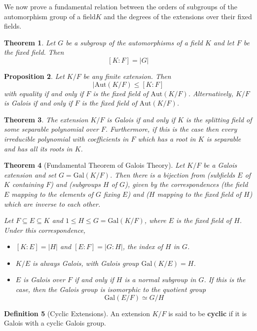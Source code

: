 \documentclass[10pt, oneside, reqno]{amsart}
\theoremstyle{plain}%
\newtheorem{thm}{Theorem}[section]
\newtheorem{prop}[thm]{Proposition}
\theoremstyle{definition}
\newtheorem{defn}[thm]{Definition}
\theoremstyle{remark}
\newcommand{\aut}[1]{\text{Aut}{(#1)}}
\newcommand{\xdeg}[2]{[#1 : #2]}
\newcommand{\gal}[2]{\text{Gal}(#1/#2)}
\begin{document}
We now prove a fundamental relation between the orders of subgroups of the automorphism group of a field$K$ and the degrees of the extensions over their fixed fields.
\begin{thm}
	Let $G$ be a subgroup of the automorphisms of a field $K$ and let $F$ be the fixed field.  Then \[
		\xdeg{K}{F} = |G|
	\]
	
\end{thm}
\begin{prop}
	Let $K/F$ be any finite extension.  Then \[
		| \aut{K/F} \leq \xdeg{K}{F}
	\] with equality if and only if $F$ is the fixed field of $\aut{K/F}$.  Alternatively, $K/F$ is Galois if and only if $F$ is the fixed field of $\aut{K/F}$.
\end{prop}

\begin{thm}
	The extension $K/F$ is Galois if and only if $K$ is the splitting field of some separable polynomial over $F$. Furthermore, if this is the case then every irreducible polynomial with coefficients in $F$ which has a root in $K$ is separable and has all its roots in $K$.
\end{thm}

\begin{thm}[Fundamental Theorem of Galois Theory] Let $K/F$ be a Galois extension and set $G = \gal{K}{F}$.  Then there is a bijection from (subfields $E$ of $K$ containing $F$) and (subgroups $H$ of $G$), given by the correspondences (the field $E$ mapping to the elements of $G$ fixing $E$) and ($H$ mapping to the fixed field of $H$) which are inverse to each other.
	
	Let $F \subseteq E \subseteq K$ and $1 \leq H \leq G = \gal{K}{F}$, where $E$ is the fixed field of $H$. Under this correspondence,
	\begin{itemize}
		\item $\xdeg{K}{E} = |H|$ and $\xdeg{E}{F} = |G:H|$, the index of $H$ in $G$.
		\item $K/E$ is always Galois, with Galois group $\gal{K}{E} = H$.
		\item $E$ is Galois over $F$ if and only if $H$ is a normal subgroup in $G$.  If this is the case, then the Galois group is isomorphic to the quotient group \[
			\gal{E}{F} \simeq G/H
		\]
	\end{itemize}
\end{thm}


\begin{defn}[Cyclic Extensions]
	An extension $K/F$ is said to be \textbf{cyclic} if it is Galois with a cyclic Galois group.
\end{defn}
\end{document}
